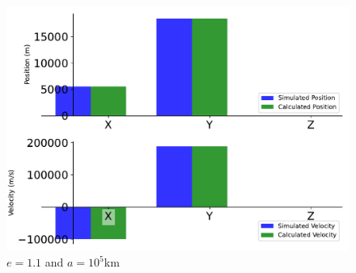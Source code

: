 \begin{figure}[htbp]\centerline{\includegraphics[height=0.7\textwidth, keepaspectratio]{AutoTeX/EquHyp_e_1}}\caption{$e = 1.1$ and $a = 10^5$km}\label{fig:EquHyp_e_1}\end{figure}